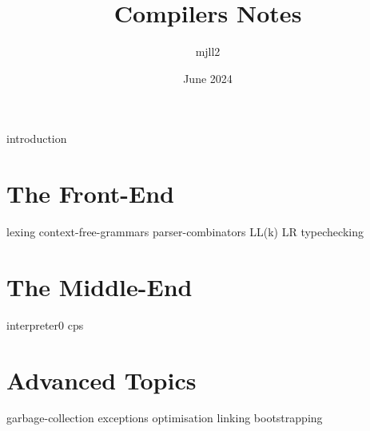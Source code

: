\documentclass[12pt,a4paper,twoside,openany, chapterprefix=on]{scrbook}
\title{Compilers Notes}
\author{mjll2}
\date{June 2024}
\begin{document}
\maketitle

\frontmatter
{
\hypersetup{linkcolor=black, linkbordercolor=white}
\tableofcontents
}

\mainmatter

{introduction}

\part{The Front-End}
{lexing}
{context-free-grammars}
{parser-combinators}
{LL(k)}
{LR}
{typechecking}

\part{The Middle-End}
{interpreter0}
{cps}

\part{Advanced Topics}
{garbage-collection}
{exceptions}
{optimisation}
{linking}
{bootstrapping}


\end{document}
